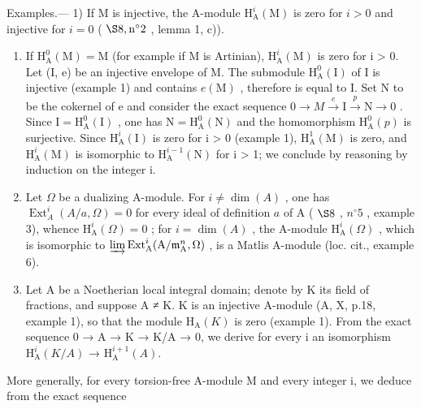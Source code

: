Examples.--- 1) If M is injective, the A-module \(\mathrm{H}_{\mathrm{A}}^{i}(\mathrm{M})\) is zero for \(i > 0\) and injective for \(i = 0\) ( \(\S 8, \mathrm{n}^{\circ}2\) , lemma 1, c)).

\begin{enumerate}
\def\labelenumi{\arabic{enumi})}
\setcounter{enumi}{1}
\item
  If \(\mathrm{H}_{\mathrm{A}}^{0}(\mathrm{M})=\mathrm{M}\) (for example if M is Artinian), \(\mathrm{H}_{\mathrm{A}}^{i}(\mathrm{M})\) is zero for i > 0. Let (I, e) be an injective envelope of M. The submodule \(\mathrm{H}_{\mathrm{A}}^{0}(\mathrm{I})\) of I is injective (example 1) and contains \(e(\mathrm{M})\) , therefore is equal to I. Set N to be the cokernel of e and consider the exact sequence \(0\rightarrow M\xrightarrow{e}\mathrm{I}\xrightarrow{p}\mathrm{N}\rightarrow0\) . Since \(\mathrm{I}=\mathrm{H}_{\mathrm{A}}^{0}(\mathrm{I})\) , one has \(\mathrm{N}=\mathrm{H}_{\mathrm{A}}^{0}(\mathrm{N})\) and the homomorphism \(\mathrm{H}_{\mathrm{A}}^{0}(p)\) is surjective. Since \(\mathrm{H}_{\mathrm{A}}^{i}(\mathrm{I})\) is zero for i > 0 (example 1), \(\mathrm{H}_{\mathrm{A}}^{1}(\mathrm{M})\) is zero, and \(\mathrm{H}_{\mathrm{A}}^{i}(\mathrm{M})\) is isomorphic to \(\mathrm{H}_{\mathrm{A}}^{i-1}(\mathrm{N})\) for i > 1; we conclude by reasoning by induction on the integer i.
\item
  Let \(\Omega\) be a dualizing A-module. For \(i \neq \dim(A)\) , one has \(\operatorname{Ext}_{A}^{i}(A/a, \Omega) = 0\) for every ideal of definition \(a\) of A ( \(\S 8\) , \(n^{\circ} 5\) , example 3), whence \(\mathrm{H}_{\mathrm{A}}^{i}(\Omega) = 0\) ; for \(i = \dim(A)\) , the A-module \(\mathrm{H}_{\mathrm{A}}^{i}(\Omega)\) , which is isomorphic to \(\varinjlim \operatorname{Ext}_{\mathrm{A}}^{i}(\mathrm{A}/\mathfrak{m}_{\mathrm{A}}^{n}, \Omega)\) , is a Matlis A-module (loc. cit., example 6).
\item
  Let A be a Noetherian local integral domain; denote by K its field of fractions, and suppose A ≠ K. K is an injective A-module (A, X, p.18, example 1), so that the module \(\mathrm{H}_{\mathrm{A}}(K)\) is zero (example 1). From the exact sequence 0 → A → K → K/A → 0, we derive for every i an isomorphism \(\mathrm{H}_{\mathrm{A}}^{i}(K/A)\) → \(\mathrm{H}_{\mathrm{A}}^{i+1}(A)\).
\end{enumerate}

More generally, for every torsion-free A-module M and every integer i, we deduce from the exact sequence


